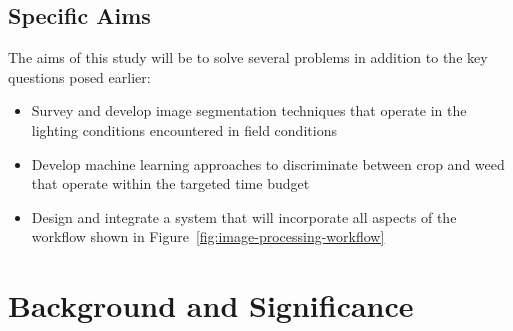 \documentclass[12pt]{article}
\begin{document}
\subsection{Specific Aims}
The aims of this study will be to solve several problems in addition to the key questions posed earlier:
\begin{itemize}
	\item{Survey and develop image segmentation techniques that operate in the lighting conditions encountered in field conditions}
	\item{Develop machine learning approaches to discriminate between crop and weed that operate within the targeted time budget}
	\item{Design and integrate a system that will incorporate all aspects of the workflow shown in Figure~\ref{fig:image-processing-workflow}}
\end{itemize}
\newpage

%
%

\section{Background and Significance}

\end{document}
